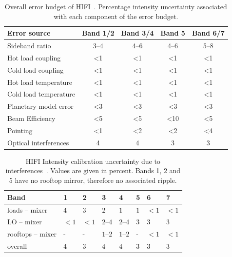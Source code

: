 \begin{table}[p]
    \centering
    \begin{tabular}{lcccc}
        \toprule
        Error source           & Band 1/2 & Band 3/4 & Band 5 & Band 6/7 \\
        \midrule
        Sideband ratio         & 3--4     & 4--6     & 4--6   & 5--8     \\
        Hot load coupling      & <1       & <1       & <1     & <1       \\
        Cold load coupling     & <1       & <1       & <1     & <1       \\
        Hot load temperature   & <1       & <1       & <1     & <1       \\
        Cold load temperature  & <1       & <1       & <1     & <1       \\
        Planetary model error  & <3       & <3       & <3     & <3       \\
        Beam Efficiency        & <5       & <5       & <10    & <5       \\
        Pointing               & <1       & <2       & <2     & <4       \\
        Optical interferences  &  4       & 4        & 3      & 3        \\
        \bottomrule
    \end{tabular}
    \caption{
        Overall error budget of HIFI~\parencite{hifiobserversmanual}.
        Percentage intensity uncertainty associated with each component of the error budget.
    }
    \label{tab:calibration_errors}
\end{table}

\begin{table}[p]
    \centering
    \begin{tabular}{l *{7}{C{0.8cm}} }
        \toprule
            Band & 1 & 2 & 3 & 4 & 5 & 6 & 7 \\
        \midrule
            loads -- mixer    & $ 4$ & $ 3$ &    $2$ &    $1$ & $1$ & $<1$ & $<1$ \\
            LO -- mixer       & $<1$ & $<1$ & $2$--$4$ & $2$--$4$ & $3$ &  $3$ &  $3$ \\
            rooftops -- mixer & -    &  -   & $1$--$2$ & $1$--$2$ & - & $<1$ & $<1$ \\
        \midrule
            overall           & $4$ & $3$ & $4$ & $4$ & $3$ & $3$ & $3$\\
        \bottomrule
    \end{tabular}
    \caption{
        HIFI Intensity calibration uncertainty due to interferences~\parencite{risacher2011standingwaves}.
        Values are given in percent.
        Bands 1, 2 and 5 have no rooftop mirror, therefore no associated ripple.
    }
    \label{tab:ripple_errors}
\end{table}

